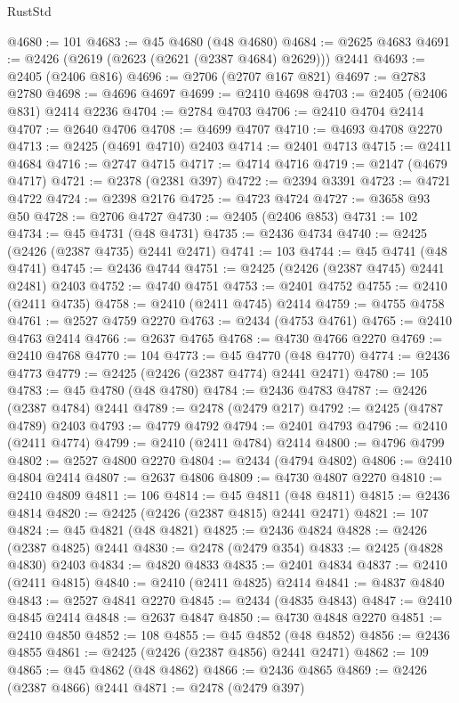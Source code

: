 \begin{lexlean}{RustStd}
\begin{coremodule}
@4680 := 101
@4683 := @45 @4680 (@48 @4680)
@4684 := @2625 @4683
@4691 := @2426 (@2619 (@2623 (@2621 (@2387 @4684) @2629))) @2441
@4693 := @2405 (@2406 @816)
@4696 := @2706 (@2707 @167 @821)
@4697 := @2783 @2780
@4698 := @4696 @4697
@4699 := @2410 @4698
@4703 := @2405 (@2406 @831) @2414 @2236
@4704 := @2784 @4703
@4706 := @2410 @4704 @2414
@4707 := @2640 @4706
@4708 := @4699 @4707
@4710 := @4693 @4708 @2270
@4713 := @2425 (@4691 @4710) @2403
@4714 := @2401 @4713
@4715 := @2411 @4684
@4716 := @2747 @4715
@4717 := @4714 @4716
@4719 := @2147 (@4679 @4717)
@4721 := @2378 (@2381 @397)
@4722 := @2394 @3391
@4723 := @4721 @4722
@4724 := @2398 @2176
@4725 := @4723 @4724
@4727 := @3658 @93 @50
@4728 := @2706 @4727
@4730 := @2405 (@2406 @853)
@4731 := 102
@4734 := @45 @4731 (@48 @4731)
@4735 := @2436 @4734
@4740 := @2425 (@2426 (@2387 @4735) @2441 @2471)
@4741 := 103
@4744 := @45 @4741 (@48 @4741)
@4745 := @2436 @4744
@4751 := @2425 (@2426 (@2387 @4745) @2441 @2481) @2403
@4752 := @4740 @4751
@4753 := @2401 @4752
@4755 := @2410 (@2411 @4735)
@4758 := @2410 (@2411 @4745) @2414
@4759 := @4755 @4758
@4761 := @2527 @4759 @2270
@4763 := @2434 (@4753 @4761)
@4765 := @2410 @4763 @2414
@4766 := @2637 @4765
@4768 := @4730 @4766 @2270
@4769 := @2410 @4768
@4770 := 104
@4773 := @45 @4770 (@48 @4770)
@4774 := @2436 @4773
@4779 := @2425 (@2426 (@2387 @4774) @2441 @2471)
@4780 := 105
@4783 := @45 @4780 (@48 @4780)
@4784 := @2436 @4783
@4787 := @2426 (@2387 @4784) @2441
@4789 := @2478 (@2479 @217)
@4792 := @2425 (@4787 @4789) @2403
@4793 := @4779 @4792
@4794 := @2401 @4793
@4796 := @2410 (@2411 @4774)
@4799 := @2410 (@2411 @4784) @2414
@4800 := @4796 @4799
@4802 := @2527 @4800 @2270
@4804 := @2434 (@4794 @4802)
@4806 := @2410 @4804 @2414
@4807 := @2637 @4806
@4809 := @4730 @4807 @2270
@4810 := @2410 @4809
@4811 := 106
@4814 := @45 @4811 (@48 @4811)
@4815 := @2436 @4814
@4820 := @2425 (@2426 (@2387 @4815) @2441 @2471)
@4821 := 107
@4824 := @45 @4821 (@48 @4821)
@4825 := @2436 @4824
@4828 := @2426 (@2387 @4825) @2441
@4830 := @2478 (@2479 @354)
@4833 := @2425 (@4828 @4830) @2403
@4834 := @4820 @4833
@4835 := @2401 @4834
@4837 := @2410 (@2411 @4815)
@4840 := @2410 (@2411 @4825) @2414
@4841 := @4837 @4840
@4843 := @2527 @4841 @2270
@4845 := @2434 (@4835 @4843)
@4847 := @2410 @4845 @2414
@4848 := @2637 @4847
@4850 := @4730 @4848 @2270
@4851 := @2410 @4850
@4852 := 108
@4855 := @45 @4852 (@48 @4852)
@4856 := @2436 @4855
@4861 := @2425 (@2426 (@2387 @4856) @2441 @2471)
@4862 := 109
@4865 := @45 @4862 (@48 @4862)
@4866 := @2436 @4865
@4869 := @2426 (@2387 @4866) @2441
@4871 := @2478 (@2479 @397)

\end{coremodule}
\end{lexlean}
